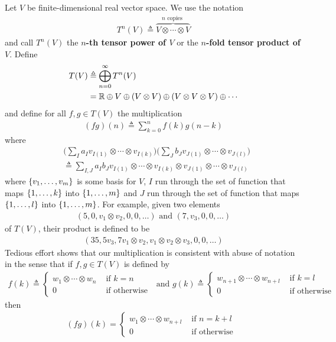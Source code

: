 \documentclass{report}
\begin{document}
\begin{mdframed}
Let $V$ be finite-dimensional real vector space. We use the notation 
 \begin{align*}
T^n(V)\triangleq  \overbrace{V \otimes  \cdots \otimes  V}^{n\text{ copies }}
\end{align*}
and call $T^{n}(V)$ the \textbf{$n$-th tensor power of $V$} or the \textbf{$n$-fold tensor product of  $V$}. Define  
\begin{align*}
  T(V)&\triangleq  \bigoplus_{n=0}^{\infty} T^n(V)\\
  &=\mathbb{R} \oplus V \oplus (V\otimes V) \oplus (V\otimes V \otimes V)  \oplus \cdots 
\end{align*}
and define for all $f,g \in T(V)$ the multiplication 
\begin{align*}
  (fg)(n)\triangleq   \sum_{k=0}^{n}f(k)g(n-k)
\end{align*}
where 
\begin{align*}
  &\Big(\sum_{I} a_I v_{I(1)}\otimes \cdots \otimes  v_{I(k)}\Big)\Big(\sum_J b_J v_{J(1)}\otimes  \cdots \otimes  v_{J(l)}\Big)\\
  &\triangleq \sum_{I,J} a_I b_J v_{I(1)}\otimes \cdots \otimes  v_{I(k)}\otimes  v_{J(1)}\otimes  \cdots \otimes  v_{J(l)}
\end{align*}
where $\{ v_1,\dots ,v_m \}$ is some basis for $V$, $I$ run through the set of function that maps $\{ 1,\dots ,k \}$ into $\{ 1,\dots ,m \}$ and $J$ run through the set of function that maps  $\{ 1,\dots ,l \}$ into $\{ 1,\dots ,m \}$. For example, given two elements  
\begin{align*}
  (5,0,v_1\otimes v_2,0,0,\dots )\text{ and }(7,v_3,0,0,\dots)
\end{align*}
of $T(V)$, their product is defined to be 
\begin{align*}
  (35,5v_3,7v_1\otimes v_2, v_1 \otimes v_2 \otimes v_3 ,0,0,\dots)
\end{align*}
Tedious effort shows that our multiplication is consistent with abuse of notation in the sense that if $f,g\in T(V)$ is defined by  
\begin{align*}
 f(k)\triangleq \begin{cases}
   w_1\otimes \cdots \otimes  w_n & \text{ if $k=n$ }\\
   0& \text{ if otherwise }
 \end{cases} \text{ and } g(k)\triangleq \begin{cases}
   w_{n+1}\otimes  \cdots \otimes  w_{n+l}& \text{ if $k=l$ }\\
   0& \text{ if otherwise }
 \end{cases} 
\end{align*}
then 
\begin{align*}
  (fg)(k)=\begin{cases}
    w_1\otimes  \cdots \otimes  w_{n+l}& \text{ if $n=k+l$ }\\
    0& \text{ if otherwise }
  \end{cases}
\end{align*}



\end{mdframed}
\end{document}
